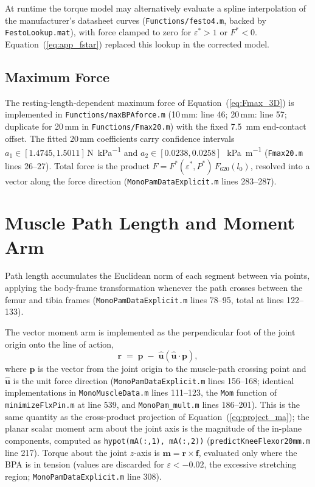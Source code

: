 At runtime the torque model may alternatively evaluate a spline interpolation of the manufacturer's datasheet curves (\texttt{Functions/festo4.m}, backed by \texttt{FestoLookup.mat}), with force clamped to zero for $\varepsilon^{*}>1$ or $F^{*}<0$. Equation~(\ref{eq:app_fstar}) replaced this lookup in the corrected model.

\subsection{Maximum Force}
The resting-length-dependent maximum force of Equation~(\ref{eq:Fmax_3D}) is implemented in \texttt{Functions/maxBPAforce.m} (10\,mm: line 46; 20\,mm: line 57; duplicate for 20\,mm in \texttt{Functions/Fmax20.m}) with the fixed \qty{7.5}{\mm} end-contact offset. The fitted 20\,mm coefficients carry confidence intervals $a_1 \in [1.4745, 1.5011]$\,\si{\N\per\kPa} and $a_2 \in [0.0238, 0.0258]$\,\si{\per\kPa\per\metre} (\texttt{Fmax20.m} lines 26--27). Total force is the product $F = F^{*}(\varepsilon^{*},P^{*})\,F_{620}(l_{0})$, resolved into a vector along the force direction (\texttt{MonoPamDataExplicit.m} lines 283--287).

\section{Muscle Path Length and Moment Arm}

Path length accumulates the Euclidean norm of each segment between via points, applying the body-frame transformation whenever the path crosses between the femur and tibia frames (\texttt{MonoPamDataExplicit.m} lines 78--95, total at lines 122--133).

The vector moment arm is implemented as the perpendicular foot of the joint origin onto the line of action,
\begin{equation}
    \mathbf{r} \;=\; \mathbf{p} \;-\; \hat{\mathbf{u}}\left(\hat{\mathbf{u}}\cdot\mathbf{p}\right),
    \label{eq:app_perpfoot}
\end{equation}
where $\mathbf{p}$ is the vector from the joint origin to the muscle-path crossing point and $\hat{\mathbf{u}}$ is the unit force direction (\texttt{MonoPamDataExplicit.m} lines 156--168; identical implementations in \texttt{MonoMuscleData.m} lines 111--123, the \texttt{Mom} function of \texttt{minimizeFlxPin.m} at line 539, and \texttt{MonoPam\_mult.m} lines 186--201). This is the same quantity as the cross-product projection of Equation~(\ref{eq:project_ma}); the planar scalar moment arm about the joint axis is the magnitude of the in-plane components, computed as \texttt{hypot(mA(:,1), mA(:,2))} (\texttt{predictKneeFlexor20mm.m} line 217). Torque about the joint $z$-axis is $\mathbf{m} = \mathbf{r}\times\mathbf{f}$, evaluated only where the BPA is in tension (values are discarded for $\varepsilon < -0.02$, the excessive stretching region; \texttt{MonoPamDataExplicit.m} line 308).

